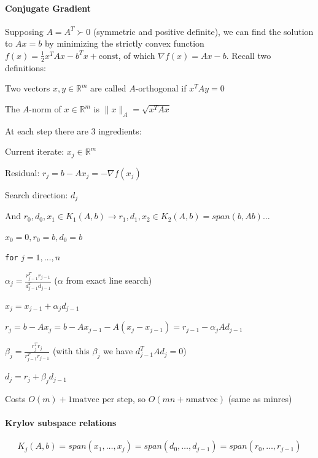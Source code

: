 \documentclass[10pt]{report}
\begin{document}
\paragraph{Conjugate Gradient} Supposing $A=A^T \succ 0$ (symmetric and positive definite), we can find the solution to $Ax = b$ by minimizing the strictly convex function $f(x) = \frac{1}{2}x^TAx-b^Tx + \text{const}$, of which $\nabla f(x) = Ax-b$. Recall two definitions:
\begin{list}{}{}
	\item Two vectors $x, y\in\mathbb{R}^m$ are called $A$-orthogonal if $x^TAy=0$
	\item The $A$-norm of $x\in\mathbb{R}^m$ is $\|x\|_A=\sqrt{x^TAx}$
\end{list}
At each step there are 3 ingredients:
\begin{list}{}{}
	\item Current iterate: $x_j\in \mathbb{R}^m$
	\item Residual: $r_j = b-Ax_j = -\nabla f(x_j)$ 
	\item Search direction: $d_j$
\end{list}
And $r_0,d_0,x_1\in K_1(A,b) \rightarrow r_1,d_1,x_2\in K_2(A,b)=span(b,Ab)\ldots$
\begin{list}{}{}
	\item $x_0=0, r_0=b, d_0=b$
	\item \texttt{for} $j=1,\ldots,n$
	\begin{list}{}{}
		\item $\alpha_j = \frac{r^T_{j-1}r_{j-1}}{d^T_{j-1}d_{j-1}}$ ($\alpha$ from exact line search)
		\item $x_j = x_{j-1}+\alpha_jd_{j-1}$
		\item $r_j = b-Ax_j = b-Ax_{j-1}-A(x_j-x_{j-1}) = r_{j-1}-\alpha_jAd_{j-1}$
		\item $\beta_j=\frac{r_j^Tr_j}{r_{j-1}^Tr_{j-1}}$ (with this $\beta_j$ we have $d_{j-1}^TAd_j=0$)
		\item $d_j = r_j+\beta_jd_{j-1}$
	\end{list}
\end{list}
Costs $O(m)+ 1\text{matvec}$ per step, so $O(mn+n\text{matvec})$ (same as minres)
\paragraph{Krylov subspace relations} $$K_j(A,b) = span(x_1,\ldots,x_j) = span(d_0,\ldots,d_{j-1}) = span(r_0,\ldots,r_{j-1})$$
\end{document}
